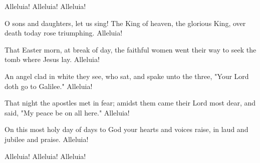 Alleluia! Alleluia! Alleluia!

O sons and daughters, let us sing!
The King of heaven, the glorious King,
over death today rose triumphing.
Alleluia!

That Easter morn, at break of day,
the faithful women went their way
to seek the tomb where Jesus lay.
Alleluia!

An angel clad in white they see,
who sat, and spake unto the three,
"Your Lord doth go to Galilee."
Alleluia!

That night the apostles met in fear;
amidst them came their Lord most dear,
and said, "My peace be on all here."
Alleluia!

On this most holy day of days
to God your hearts and voices raise,
in laud and jubilee and praise.
Alleluia!

Alleluia! Alleluia! Alleluia!
